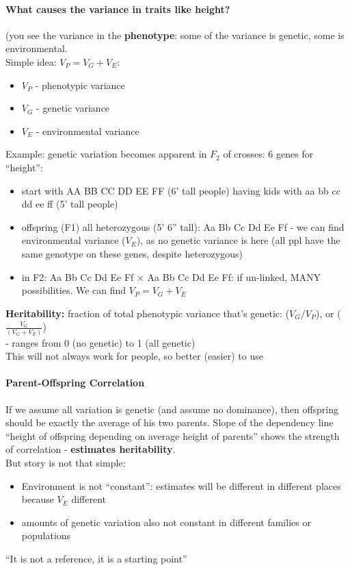 \documentclass{scrartcl}
\begin{document}
\paragraph{What causes the variance in traits like height?}
(you see the variance in the {\bf phenotype}: some of the variance is genetic, some is environmental.\\
Simple idea: $V_P = V_G + V_E$:
\begin{itemize}
\item $V_P$ - phenotypic variance
\item $V_G$ - genetic variance
\item $V_E$ - environmental variance
\end{itemize}
Example: genetic variation becomes apparent in $F_2$ of crosses: 6 genes for ``height'':
\begin{itemize}
\item start with AA BB CC DD EE FF (6' tall people) having kids with aa bb cc dd ee ff (5' tall people)
\item offspring (F1) all heterozygous (5' 6'' tall): Aa Bb Cc Dd Ee Ff - we can find environmental variance ($V_E$), as no genetic variance is here (all ppl have the same genotype on these genes, despite heterozygous)
\item in F2: Aa Bb Cc Dd Ee Ff $\times$ Aa Bb Cc Dd Ee Ff: if un-linked, MANY possibilities.
  We can find $V_P = V_G + V_E$
\end{itemize}

{\bf Heritability:} fraction of total phenotypic variance that's genetic: ($V_G/V_P$), or ($\frac{V_G}{(V_G + V_E)}$)\\
- ranges from 0 (no genetic) to 1 (all genetic)\\
This will not always work for people, so better (easier) to use

\paragraph{Parent-Offspring Correlation}
If we assume all variation is genetic (and assume no dominance), then offspring should be exactly the average of his two parents.
Slope of the dependency line ``height of offspring depending on average height of parents'' shows the strength of correlation - {\bf estimates heritability}.\\
But story is not that simple:
\begin{itemize}
\item Environment is not ``constant'': estimates will be different in different places because $V_E$ different
\item amounts of genetic variation also not constant in different families or populations
\end{itemize}
``It is not a reference, it is a starting point''
\end{document}
